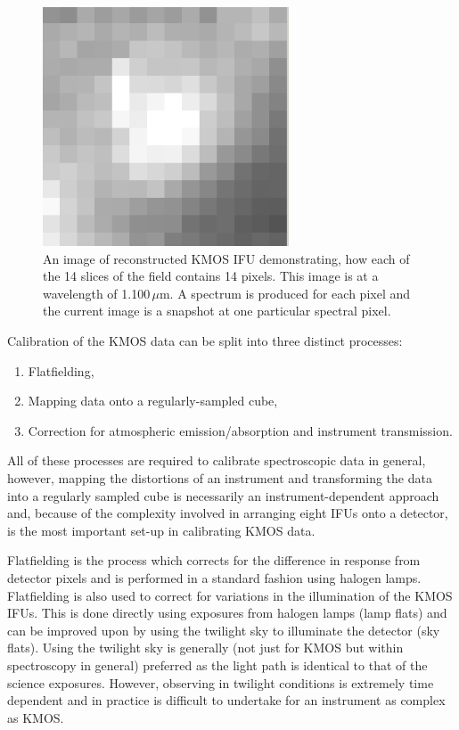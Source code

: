 \begin{figure}
 \centering
 \includegraphics[width=0.65\textwidth]{kmos/kmos-ifu}
 \caption[An example of a reconstrucuted KMOS IFU]{An image of reconstructed KMOS IFU demonstrating, how each of the 14 slices of the field contains 14 pixels.
 This image is at a wavelength of 1.100\,$\mu$m.
 A spectrum is produced for each pixel and the current image is a snapshot at one particular spectral pixel.
 \label{fig:kmosIFU}}
\end{figure}

Calibration of the KMOS data can be split into three distinct processes:

\begin{enumerate}
    \item Flatfielding,
    \item Mapping data onto a regularly-sampled cube,
    \item Correction for atmospheric emission/absorption and instrument transmission.
\end{enumerate}

All of these processes are required to calibrate spectroscopic data in general, however, mapping the distortions of an instrument and transforming the data into a regularly sampled cube is necessarily an instrument-dependent approach and,
because of the complexity involved in arranging eight IFUs onto a detector, is the most important set-up in calibrating KMOS data.

Flatfielding is the process which corrects for the difference in response from detector pixels and is performed in a standard fashion using halogen lamps.
Flatfielding is also used to correct for variations in the illumination of the KMOS IFUs.
This is done directly using exposures from halogen lamps (lamp flats) and can be improved upon by using the twilight sky to illuminate the detector (sky flats).
Using the twilight sky is generally (not just for KMOS but within spectroscopy in general) preferred as the light path is identical to that of the science exposures.
However, observing in twilight conditions is extremely time dependent and in practice is difficult to undertake for an instrument as complex as KMOS.

